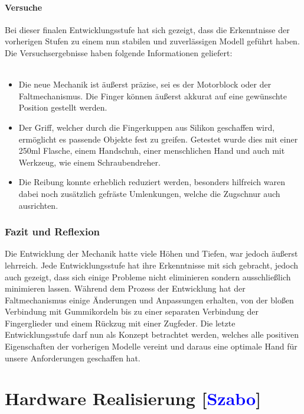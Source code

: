 \documentclass[titlepage,12pt,twoside]{article}
\begin{document}
\paragraph{Versuche}
\hfill \break
\hfill \break
Bei dieser finalen Entwicklungsstufe hat sich gezeigt, dass die Erkenntnisse der 
vorherigen Stufen zu einem nun stabilen und zuverlässigen Modell geführt haben. 
Die Versuchsergebnisse haben folgende Informationen geliefert: \\
\\
\begin{itemize}
	\item Die neue Mechanik ist äußerst präzise, sei es der Motorblock oder der 
	Faltmechanismus. Die Finger können äußerst akkurat auf eine gewünschte 
	Position gestellt werden.
	\item Der Griff, welcher durch die Fingerkuppen aus Silikon geschaffen wird, 
	ermöglicht es passende Objekte fest zu greifen. Getestet wurde dies mit einer 
	250ml Flasche, einem Handschuh, einer menschlichen Hand und auch mit Werkzeug, 
	wie einem Schraubendreher. 
	\item Die Reibung konnte erheblich reduziert werden, besonders hilfreich waren 
	dabei noch zusätzlich gefräste Umlenkungen, welche die Zugschnur auch 
	ausrichten. 
\end{itemize}

\subsubsection{Fazit und Reflexion}
Die Entwicklung der Mechanik hatte viele Höhen und Tiefen, war jedoch äußerst 
lehrreich. Jede Entwicklungsstufe hat ihre Erkenntnisse mit sich gebracht, jedoch 
auch gezeigt, dass sich einige Probleme nicht eliminieren sondern ausschließlich 
minimieren lassen. Während dem Prozess der Entwicklung hat der Faltmechanismus 
einige Änderungen und Anpassungen erhalten, von der bloßen Verbindung mit 
Gummikordeln bis zu einer separaten Verbindung der Fingerglieder und einem 
Rückzug mit einer Zugfeder. Die letzte Entwicklungsstufe darf nun als Konzept 
betrachtet werden, welches alle positiven Eigenschaften der vorherigen Modelle 
vereint und daraus eine optimale Hand für unsere Anforderungen geschaffen hat. \\

\newpage
\section{Hardware Realisierung  [\textcolor{blue}{Szabo}]}
\end{document}
